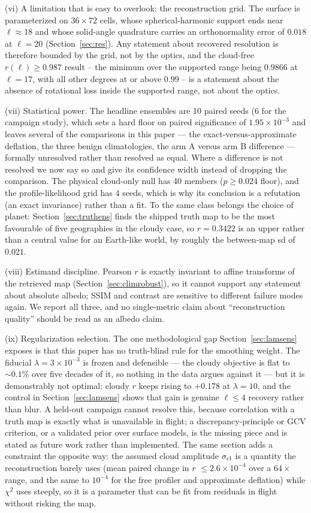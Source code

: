 \documentclass[twocolumn,10pt]{article}
\begin{document}
(vi) A limitation that is easy to overlook: the reconstruction grid. The
surface is parameterized on $36\times72$ cells, whose spherical-harmonic
support ends near $\ell\approx18$ and whose solid-angle quadrature carries an
orthonormality error of $0.018$ at $\ell=20$ (Section~\ref{sec:res}). Any
statement about recovered resolution is therefore bounded by the grid, not by
the optics, and the cloud-free $r(\ell)\ge0.987$ result -- the minimum over the
supported range being $0.9866$ at $\ell=17$, with all other degrees at or above
$0.99$ -- is a statement about the absence of rotational loss inside the
supported range, not about the optics.

(vii) Statistical power. The headline ensembles are 10 paired seeds (6 for
the campaign study), which sets a hard floor on paired significance of
$1.95\times10^{-3}$ and leaves several of the comparisons in this paper --- the
exact-versus-approximate deflation, the three benign climatologies, the arm A
versus arm B difference --- formally unresolved rather than resolved as equal.
Where a difference is not resolved we now say so and give its confidence width
instead of dropping the comparison. The physical cloud-only null has 40 members
($p\ge0.024$ floor), and the profile-likelihood grid has 4 seeds, which is why
its conclusion is a refutation (an exact invariance) rather than a fit. To the
same class belongs the choice of planet: Section~\ref{sec:truthens} finds the
shipped truth map to be the most favourable of five geographies in the cloudy
case, so $r=0.3422$ is an upper rather than a central value for an Earth-like
world, by roughly the between-map sd of $0.021$.

(viii) Estimand discipline. Pearson $r$ is exactly invariant to affine
transforms of the retrieved map (Section~\ref{sec:climrobust}), so it cannot
support any statement about absolute albedo; SSIM and contrast are sensitive to
different failure modes again. We report all three, and no single-metric claim
about ``reconstruction quality'' should be read as an albedo claim.

(ix) Regularization selection. The one methodological gap
Section~\ref{sec:lamsens} exposes is that this paper has no truth-blind rule for
the smoothing weight. The fiducial $\lambda=3\times10^{-3}$ is frozen and
defensible --- the cloudy objective is flat to $\sim0.1\%$ over five decades of
it, so nothing in the data argues against it --- but it is demonstrably not
optimal: cloudy $r$ keeps rising to $+0.178$ at $\lambda=10$, and the control in
Section~\ref{sec:lamsens} shows that gain is genuine $\ell\le4$ recovery rather
than blur. A held-out campaign cannot resolve this, because correlation with a
truth map is exactly what is unavailable in flight; a discrepancy-principle or
GCV criterion, or a validated prior over surface models, is the missing piece and
is stated as future work rather than implemented. The same section adds a
constraint the opposite way: the assumed cloud amplitude $\sigma_{\rm cl}$ is a
quantity the reconstruction barely uses (mean paired change in $r$
$\le2.6\times10^{-4}$ over a $64\times$ range, and the same to $10^{-4}$ for the free
profiler and approximate deflation) while $\chi^2$ uses steeply, so it is a parameter that can be
fit from residuals in flight without risking the map.
\end{document}
